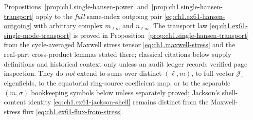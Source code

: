 \begin{remark}
\label{rem:ch1.single-multipole-scope}
Propositions~\ref{prop:ch1.single-hansen-power} and~\ref{prop:ch1.single-hansen-transport} apply to the \emph{full} same-index outgoing pair \eqref{eq:ch1.ex61-hansen-outgoing} with arbitrary complex $m_{\ell m}$ and $n_{\ell m}$. The transport law \eqref{eq:ch1.ex61-single-mode-transport} is proved in Proposition~\ref{prop:ch1.single-hansen-transport} from the cycle-averaged Maxwell stress tensor \eqref{eq:ch1.maxwell-stress} and the real-part cross-product lemmas stated there; classical citations below supply definitions and historical context only unless an audit ledger records verified page inspection. They do \emph{not} extend to sums over distinct $(\ell,m)$, to full-vector $\mathcal{J}_z$ eigenfields, to the equatorial ring-source coefficient map, or to the separable $(m,\sigma)$ bookkeeping symbols below unless separately proved; Jackson's shell-content identity \eqref{eq:ch1.ex61-jackson-shell} remains distinct from the Maxwell-stress flux \eqref{eq:ch1.ex61-flux-from-stress}.
\end{remark}

